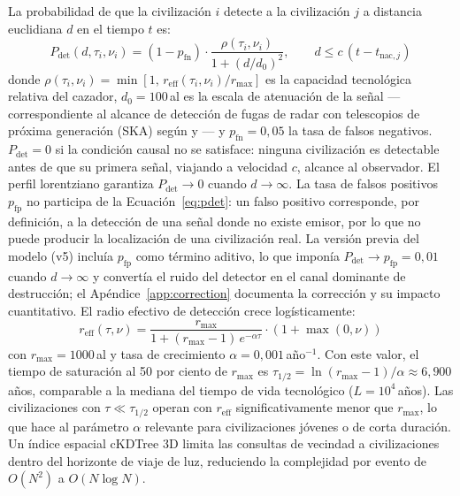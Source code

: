 \documentclass[useAMS,usenatbib,onecolumn]{mn2e}
\begin{document}
La probabilidad de que la civilización $i$ detecte a la civilización
$j$ a distancia euclidiana $d$ en el tiempo $t$ es:
\begin{equation}
  P_\text{det}(d, \tau_i, \nu_i) =
    (1 - p_\text{fn})
    \cdot \frac{\rho(\tau_i,\nu_i)}{1 + (d/d_0)^2},
  \qquad d \leq c\,(t - t_{\text{nac},j})
  \label{eq:pdet}
\end{equation}
donde $\rho(\tau_i,\nu_i) = \min[1,\, r_\text{eff}(\tau_i,\nu_i)/r_\text{max}]$
es la capacidad tecnológica relativa del cazador, $d_0 = 100$\,al es
la escala de atenuación de la señal —correspondiente al alcance de
detección de fugas de radar con telescopios de próxima generación (SKA)
según \citet{loeb2007} y \citet{forgannichol2011}— y
$p_\text{fn} = 0{,}05$ la tasa de falsos negativos.
$P_\text{det} = 0$ si la condición causal no se satisface: ninguna
civilización es detectable antes de que su primera señal, viajando a
velocidad $c$, alcance al observador.
El perfil lorentziano garantiza $P_\text{det} \to 0$ cuando
$d \to \infty$.
La tasa de falsos positivos $p_\text{fp}$ no participa de la
Ecuación~\ref{eq:pdet}: un falso positivo corresponde, por definición,
a la detección de una señal donde no existe emisor, por lo que no puede
producir la localización de una civilización real.
La versión previa del modelo (v5) incluía $p_\text{fp}$ como término
aditivo, lo que imponía $P_\text{det} \to p_\text{fp} = 0{,}01$ cuando
$d \to \infty$ y convertía el ruido del detector en el canal dominante
de destrucción; el Apéndice~\ref{app:correction} documenta la
corrección y su impacto cuantitativo.
El radio efectivo de detección crece logísticamente:
\begin{equation}
  r_\text{eff}(\tau, \nu) =
    \frac{r_\text{max}}{1 + (r_\text{max}-1)\,e^{-\alpha\tau}}
    \cdot (1 + \max(0,\nu))
  \label{eq:reff}
\end{equation}
con $r_\text{max} = 1000$\,al \citep{troitskij1989,loeb2007} y tasa
de crecimiento $\alpha = 0{,}001$\,año$^{-1}$.
Con este valor, el tiempo de saturación al 50 por ciento de
$r_\text{max}$ es
$\tau_{1/2} = \ln(r_\text{max}-1)/\alpha \approx 6{,}900$\,años,
comparable a la mediana del tiempo de vida tecnológico ($L = 10^4$\,años).
Las civilizaciones con $\tau \ll \tau_{1/2}$ operan con $r_\text{eff}$
significativamente menor que $r_\text{max}$, lo que hace al parámetro
$\alpha$ relevante para civilizaciones jóvenes o de corta duración.
Un índice espacial cKDTree 3D \citep{maneewongvatana1999} limita las
consultas de vecindad a civilizaciones dentro del horizonte de viaje
de luz, reduciendo la complejidad por evento de $O(N^2)$ a
$O(N \log N)$.
\end{document}

